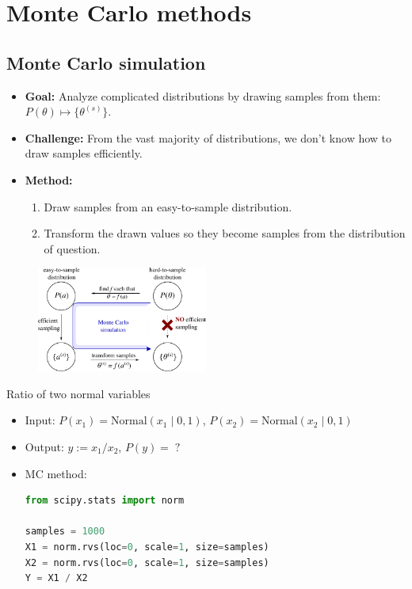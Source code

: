 \clearpage
\section{Monte Carlo methods}

\subsection{Monte Carlo simulation}
\begin{itemize}
	\item {\bf Goal:} Analyze complicated distributions by drawing samples from them: $P(\theta) \mapsto \{\theta^{(s)}\}$. 
	\item {\bf Challenge:} From the vast majority of distributions, we don't know how to draw samples efficiently.
	\item {\bf Method:} 
	\begin{enumerate}
		\item Draw samples from an easy-to-sample distribution.
		\item Transform the drawn values so they become samples from the distribution of question.
	\end{enumerate}
\end{itemize}
\begin{figure}[h]
\centering
\includegraphics[width=0.5\textwidth]{./figs/07-MC.pdf}
\end{figure}


 Ratio of two normal variables
\begin{itemize}
	\item Input: $P(x_1) = \text{Normal}(x_1\;|\;0, 1)$, $P(x_2) = \text{Normal}(x_2\;|\;0, 1)$
	\item Output: $y := x_1 / x_2$, $P(y) = \;?$
	\item MC method:
\begin{lstlisting}[language=python]
from scipy.stats import norm

samples = 1000
X1 = norm.rvs(loc=0, scale=1, size=samples)
X2 = norm.rvs(loc=0, scale=1, size=samples)
Y = X1 / X2
\end{lstlisting}

\end{itemize}

